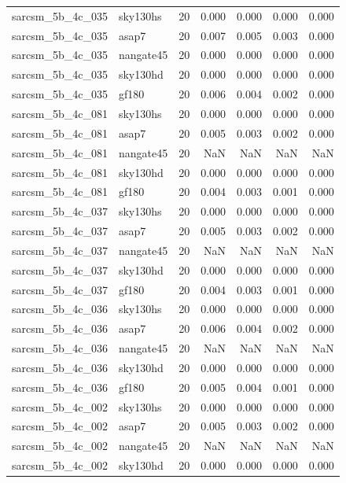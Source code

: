 \begin{tabular}{llrrrrr}
sarcsm\_5b\_4c\_035 & sky130hs & 20 & 0.000 & 0.000 & 0.000 & 0.000 \\
sarcsm\_5b\_4c\_035 & asap7 & 20 & 0.007 & 0.005 & 0.003 & 0.000 \\
sarcsm\_5b\_4c\_035 & nangate45 & 20 & 0.000 & 0.000 & 0.000 & 0.000 \\
sarcsm\_5b\_4c\_035 & sky130hd & 20 & 0.000 & 0.000 & 0.000 & 0.000 \\
sarcsm\_5b\_4c\_035 & gf180 & 20 & 0.006 & 0.004 & 0.002 & 0.000 \\
sarcsm\_5b\_4c\_081 & sky130hs & 20 & 0.000 & 0.000 & 0.000 & 0.000 \\
sarcsm\_5b\_4c\_081 & asap7 & 20 & 0.005 & 0.003 & 0.002 & 0.000 \\
sarcsm\_5b\_4c\_081 & nangate45 & 20 & NaN & NaN & NaN & NaN \\
sarcsm\_5b\_4c\_081 & sky130hd & 20 & 0.000 & 0.000 & 0.000 & 0.000 \\
sarcsm\_5b\_4c\_081 & gf180 & 20 & 0.004 & 0.003 & 0.001 & 0.000 \\
sarcsm\_5b\_4c\_037 & sky130hs & 20 & 0.000 & 0.000 & 0.000 & 0.000 \\
sarcsm\_5b\_4c\_037 & asap7 & 20 & 0.005 & 0.003 & 0.002 & 0.000 \\
sarcsm\_5b\_4c\_037 & nangate45 & 20 & NaN & NaN & NaN & NaN \\
sarcsm\_5b\_4c\_037 & sky130hd & 20 & 0.000 & 0.000 & 0.000 & 0.000 \\
sarcsm\_5b\_4c\_037 & gf180 & 20 & 0.004 & 0.003 & 0.001 & 0.000 \\
sarcsm\_5b\_4c\_036 & sky130hs & 20 & 0.000 & 0.000 & 0.000 & 0.000 \\
sarcsm\_5b\_4c\_036 & asap7 & 20 & 0.006 & 0.004 & 0.002 & 0.000 \\
sarcsm\_5b\_4c\_036 & nangate45 & 20 & NaN & NaN & NaN & NaN \\
sarcsm\_5b\_4c\_036 & sky130hd & 20 & 0.000 & 0.000 & 0.000 & 0.000 \\
sarcsm\_5b\_4c\_036 & gf180 & 20 & 0.005 & 0.004 & 0.001 & 0.000 \\
sarcsm\_5b\_4c\_002 & sky130hs & 20 & 0.000 & 0.000 & 0.000 & 0.000 \\
sarcsm\_5b\_4c\_002 & asap7 & 20 & 0.005 & 0.003 & 0.002 & 0.000 \\
sarcsm\_5b\_4c\_002 & nangate45 & 20 & NaN & NaN & NaN & NaN \\
sarcsm\_5b\_4c\_002 & sky130hd & 20 & 0.000 & 0.000 & 0.000 & 0.000 \\

\end{tabular}
